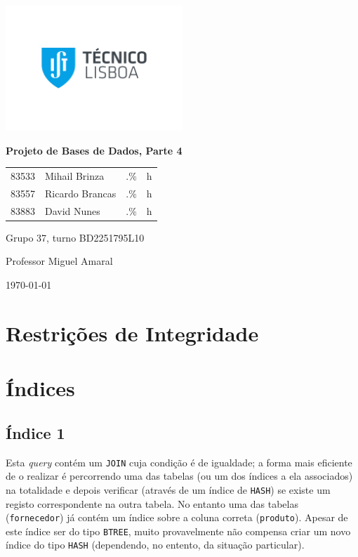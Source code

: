 \documentclass[a4paper]{article}
\begin{document}
    \begin{titlepage}
        \centering
        \includegraphics[width=0.5\textwidth]{IST_A_CMYK_POS.pdf}\par
        {\huge\bfseries Projeto de Bases de Dados, Parte 4\par}
        \vspace{2cm}
        {
        \Large
        \begin{tabular}{llll}
            83533 & Mihail Brinza & .\% & h \\
            83557 & Ricardo Brancas & .\% & h \\
            83883 & David Nunes & .\% & h
        \end{tabular}
        }
        \vfill
        \large
        Grupo 37, turno BD2251795L10 \par
        Professor Miguel Amaral

        \vspace{3cm}

        {\normalsize \today\par}
    \end{titlepage}

    \section{Restrições de Integridade}
    

    \section{Índices}

    \subsection{Índice 1}\label{subsec:ind1}
    Esta \textit{query} contém um \lstinline{JOIN} cuja condição é de igualdade; a forma mais eficiente de o
    realizar é percorrendo uma das tabelas (ou um dos índices a ela associados) na totalidade e depois verificar
    (através de um índice de \lstinline{HASH}) se existe um registo correspondente na outra tabela.
    No entanto uma das tabelas (\lstinline{fornecedor}) já contém um índice sobre a coluna correta
    (\lstinline{produto}). Apesar de este índice ser do tipo \lstinline{BTREE}, muito provavelmente
    não compensa criar um novo índice do tipo \lstinline{HASH} (dependendo, no entento, da situação particular).
\end{document}
